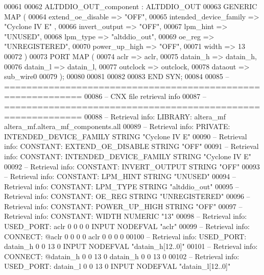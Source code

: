 \begin{DoxyCode}
{00061 
00062     ALTDDIO\_OUT\_component : ALTDDIO\_OUT
00063     \textcolor{keywordflow}{GENERIC} \textcolor{keywordflow}{MAP} (
00064         extend\_oe\_disable => \textcolor{keyword}{"OFF"},
00065         intended\_device\_family => \textcolor{keyword}{"Cyclone IV E"}  ,
00066         invert\_output => \textcolor{keyword}{"OFF"},
00067         lpm\_hint => \textcolor{keyword}{"UNUSED"},
00068         lpm\_type => \textcolor{keyword}{"altddio\_out"},
00069         oe\_reg => \textcolor{keyword}{"UNREGISTERED"},
00070         power\_up\_high => \textcolor{keyword}{"OFF"},
00071         width => \textcolor{vhdllogic}{13}
00072     \textcolor{vhdlchar}{)}
00073     \textcolor{keywordflow}{PORT} \textcolor{keywordflow}{MAP} (
00074         aclr => aclr,
00075         datain\_h => datain_h,
00076         datain\_l => datain_l,
00077         outclock => outclock,
00078         dataout => sub_wire0
00079     \textcolor{vhdlchar}{)};
00080 
00081 
00082 
00083 \textcolor{keywordflow}{END} \textcolor{vhdlchar}{SYN};
00084 
00085 \textcolor{keyword}{-- ============================================================}
00086 \textcolor{keyword}{-- CNX file retrieval info}
00087 \textcolor{keyword}{-- ============================================================}
00088 \textcolor{keyword}{-- Retrieval info: LIBRARY: altera\_mf altera\_mf.altera\_mf\_components.all}
00089 \textcolor{keyword}{-- Retrieval info: PRIVATE: INTENDED\_DEVICE\_FAMILY STRING "Cyclone IV E"}
00090 \textcolor{keyword}{-- Retrieval info: CONSTANT: EXTEND\_OE\_DISABLE STRING "OFF"}
00091 \textcolor{keyword}{-- Retrieval info: CONSTANT: INTENDED\_DEVICE\_FAMILY STRING "Cyclone IV E"}
00092 \textcolor{keyword}{-- Retrieval info: CONSTANT: INVERT\_OUTPUT STRING "OFF"}
00093 \textcolor{keyword}{-- Retrieval info: CONSTANT: LPM\_HINT STRING "UNUSED"}
00094 \textcolor{keyword}{-- Retrieval info: CONSTANT: LPM\_TYPE STRING "altddio\_out"}
00095 \textcolor{keyword}{-- Retrieval info: CONSTANT: OE\_REG STRING "UNREGISTERED"}
00096 \textcolor{keyword}{-- Retrieval info: CONSTANT: POWER\_UP\_HIGH STRING "OFF"}
00097 \textcolor{keyword}{-- Retrieval info: CONSTANT: WIDTH NUMERIC "13"}
00098 \textcolor{keyword}{-- Retrieval info: USED\_PORT: aclr 0 0 0 0 INPUT NODEFVAL "aclr"}
00099 \textcolor{keyword}{-- Retrieval info: CONNECT: @aclr 0 0 0 0 aclr 0 0 0 0}
00100 \textcolor{keyword}{-- Retrieval info: USED\_PORT: datain\_h 0 0 13 0 INPUT NODEFVAL "datain\_h[12..0]"}
00101 \textcolor{keyword}{-- Retrieval info: CONNECT: @datain\_h 0 0 13 0 datain\_h 0 0 13 0}
00102 \textcolor{keyword}{-- Retrieval info: USED\_PORT: datain\_l 0 0 13 0 INPUT NODEFVAL "datain\_l[12..0]"}
}
\end{DoxyCode}
